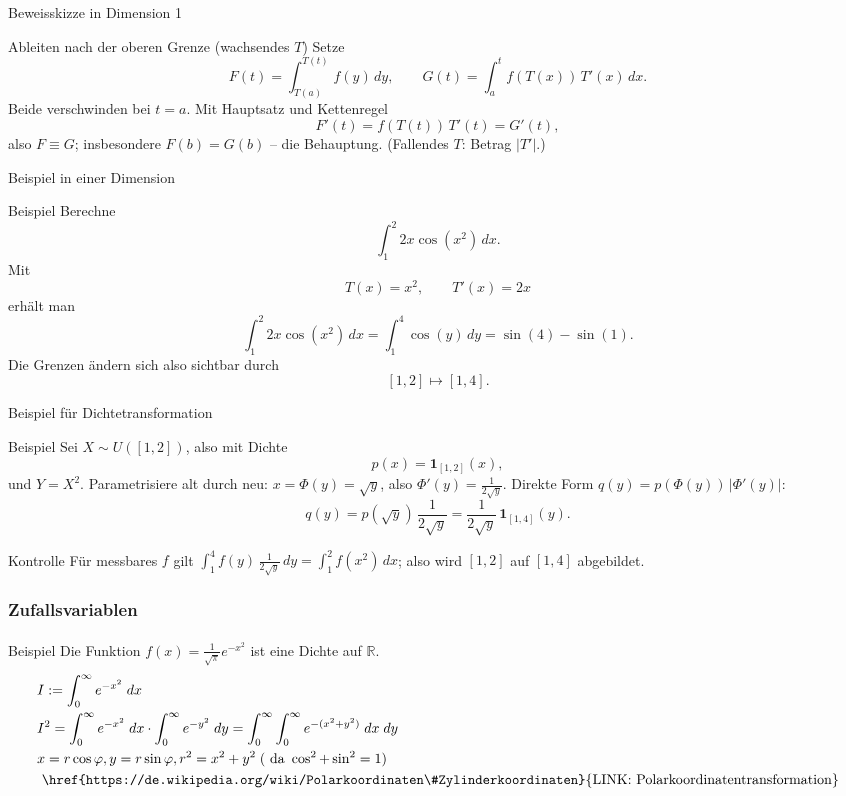 \documentclass{beamer}
\begin{document}
\begin{frame}{Beweisskizze in Dimension 1}
\begin{block}{Ableiten nach der oberen Grenze (wachsendes \(T\))}
Setze
\[
F(t)=\int_{T(a)}^{T(t)} f(y)\,dy,\qquad G(t)=\int_a^t f(T(x))\,T'(x)\,dx.
\]
Beide verschwinden bei \(t=a\). Mit Hauptsatz und Kettenregel
\[
F'(t)=f(T(t))\,T'(t)=G'(t),
\]
also \(F\equiv G\); insbesondere \(F(b)=G(b)\) -- die Behauptung. (Fallendes \(T\): Betrag \(|T'|\).)
\end{block}
\end{frame}

\begin{frame}{Beispiel in einer Dimension}
\begin{block}{Beispiel}
Berechne
\[
\int_1^2 2x\cos(x^2)\,dx.
\]
Mit
\[
T(x)=x^2,\qquad T'(x)=2x
\]
erhält man
\[
\int_1^2 2x\cos(x^2)\,dx
=
\int_1^4 \cos(y)\,dy
=
\sin(4)-\sin(1).
\]
Die Grenzen ändern sich also sichtbar durch
\[
[1,2]\mapsto [1,4].
\]
\end{block}
\end{frame}

\begin{frame}{Beispiel für Dichtetransformation}
\begin{block}{Beispiel}
Sei \(X\sim U([1,2])\), also mit Dichte
\[
p(x)=\mathbf 1_{[1,2]}(x),
\]
und \(Y=X^2\). Parametrisiere alt durch neu: \(x=\Phi(y)=\sqrt y\), also \(\Phi'(y)=\tfrac{1}{2\sqrt y}\). Direkte Form \(q(y)=p(\Phi(y))\,|\Phi'(y)|\):
\[
q(y)=p(\sqrt y)\,\frac{1}{2\sqrt y}
=
\frac{1}{2\sqrt y}\,\mathbf 1_{[1,4]}(y).
\]
\end{block}

\begin{block}{Kontrolle}
Für messbares \(f\) gilt \(\displaystyle\int_1^4 f(y)\,\frac{1}{2\sqrt y}\,dy=\int_1^2 f(x^2)\,dx\); also wird \([1,2]\) auf \([1,4]\) abgebildet.
\end{block}
\end{frame}


\begin{frame}
    \frametitle{Zufallsvariablen}
\framesubtitle{}
\begin{block}{Beispiel}
Die Funktion $f(x) = \frac{1}{\sqrt{\pi}} e^{- x^2}$ ist eine Dichte auf $ \mathbb{R}$.
\begin{align*}
& I := \int_{0}^{\infty} e^{-x^2} \; dx\\
& I^2 =  \int_{0}^{\infty} e^{-x^2} \; dx \cdot    \int_{0}^{\infty} e^{-y^2} \; dy =    \int_{0}^{\infty} \int_{0}^{\infty} e^{-(x^2+y^2)} \; dx \;dy \\
&x=r \cos \varphi ,y=r\sin \varphi ,r^2 = x^2 + y^2  \; (\text{ da } \cos^2 + \sin^2 = 1)\\
 &\text{ \href{https://de.wikipedia.org/wiki/Polarkoordinaten\#Zylinderkoordinaten}{LINK: Polarkoordinatentransformation}}
\end{align*}
\end{block}
 \end{frame}
\end{document}
